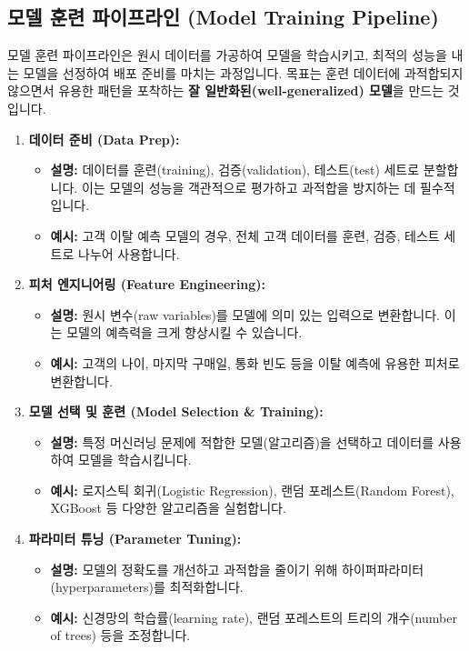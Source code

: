 \documentclass[11pt,a4paper]{article}
\begin{document}
\subsection{모델 훈련 파이프라인 (Model Training Pipeline)}

\begin{summarybox}
모델 훈련 파이프라인은 원시 데이터를 가공하여 모델을 학습시키고, 최적의 성능을 내는 모델을 선정하여 배포 준비를 마치는 과정입니다. 목표는 훈련 데이터에 과적합되지 않으면서 유용한 패턴을 포착하는 \textbf{잘 일반화된(well-generalized) 모델}을 만드는 것입니다.
\end{summarybox}

\begin{enumerate}
    \item \textbf{데이터 준비 (Data Prep):}
    \begin{itemize}
        \item \textbf{설명:} 데이터를 훈련(training), 검증(validation), 테스트(test) 세트로 분할합니다. 이는 모델의 성능을 객관적으로 평가하고 과적합을 방지하는 데 필수적입니다.
        \item \textbf{예시:} 고객 이탈 예측 모델의 경우, 전체 고객 데이터를 훈련, 검증, 테스트 세트로 나누어 사용합니다.
    \end{itemize}

    \item \textbf{피처 엔지니어링 (Feature Engineering):}
    \begin{itemize}
        \item \textbf{설명:} 원시 변수(raw variables)를 모델에 의미 있는 입력으로 변환합니다. 이는 모델의 예측력을 크게 향상시킬 수 있습니다.
        \item \textbf{예시:} 고객의 나이, 마지막 구매일, 통화 빈도 등을 이탈 예측에 유용한 피처로 변환합니다.
    \end{itemize}

    \item \textbf{모델 선택 및 훈련 (Model Selection \& Training):}
    \begin{itemize}
        \item \textbf{설명:} 특정 머신러닝 문제에 적합한 모델(알고리즘)을 선택하고 데이터를 사용하여 모델을 학습시킵니다.
        \item \textbf{예시:} 로지스틱 회귀(Logistic Regression), 랜덤 포레스트(Random Forest), XGBoost 등 다양한 알고리즘을 실험합니다.
    \end{itemize}

    \item \textbf{파라미터 튜닝 (Parameter Tuning):}
    \begin{itemize}
        \item \textbf{설명:} 모델의 정확도를 개선하고 과적합을 줄이기 위해 하이퍼파라미터(hyperparameters)를 최적화합니다.
        \item \textbf{예시:} 신경망의 학습률(learning rate), 랜덤 포레스트의 트리의 개수(number of trees) 등을 조정합니다.
    \end{itemize}


\end{enumerate}
\end{document}
